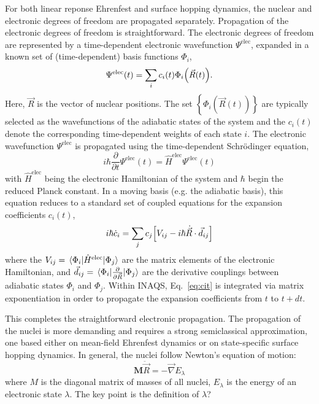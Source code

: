 \documentclass[journal=jctcce,manuscript=article,layout=traditional]{achemso}
\newcommand{\mat}[1]{\ensuremath{\mathbf{#1}}}
\newcommand{\refeq}[1]{Eq.~\ref{#1}}
\begin{document}
For both linear reponse Ehrenfest and surface hopping dynamics, 
the nuclear and electronic degrees of freedom are propagated separately.
Propagation of the electronic degrees of freedom is straightforward.
The electronic degrees of freedom are represented by a time-dependent electronic wavefunction $\Psi^{\textrm{elec}}$, expanded in a known set of (time-dependent) basis functions $\Phi_i$,
\begin{equation}
    \Psi^{\textrm{elec}}(t) = \sum_i c_i(t) \Phi_i \qty(\vec{R}(t)).
\end{equation}
Here, $\vec{R}$ is the vector of nuclear positions.
%
The set $\left\{\Phi_i(\vec{R}(t))\right\}$ are typically selected as the wavefunctions of the adiabatic states of the system and the $c_i(t)$ denote the corresponding time-dependent weights of each state $i$.
The electronic wavefunction $\Psi^{\textrm{elec}}$ is propagated using the time-dependent Schr\"{o}dinger equation,
\begin{equation}
    i\hbar \dfrac{\partial}{\partial t} \Psi^{\textrm{elec}}(t) = \hat{H}^{\textrm{elec}} \Psi^{\textrm{elec}}(t)
\end{equation}
with $\hat{H}^{\textrm{elec}}$ being the electronic Hamiltonian of the system and $\hbar$ begin the reduced Planck constant.
In a moving basis (e.g. the adiabatic basis), this equation reduces to a standard set of coupled equations for the expansion coefficients $c_i(t)$,
\begin{equation}\label{eq:cit}
  i\hbar \dot{c}_i = \sum_j c_j \qty[V_{ij} - i\hbar\dot{\vec{R}}\cdot \vec{d}_{ij}]
\end{equation}
where the $V_{ij} = \mel{\Phi_i}{\hat{H}^{\textrm{elec}}}{\Phi_j}$ are the matrix elements of the electronic Hamiltonian, and $\vec{d}_{ij}=\mel{\Phi_i}{\frac{\partial}{\partial \vec{R}}}{\Phi_j}$ are the derivative couplings between adiabatic states ${\Phi_i}$ and ${\Phi_j}$.
%
Within INAQS, \refeq{eq:cit} is integrated via matrix exponentiation in order to propagate the expansion coefficients from $t$ to $t+dt$.

This completes the straightforward electronic propagation. The propagation of the nuclei is more demanding and requires a strong semiclassical approximation, one based either on mean-field Ehrenfest dynamics or on  state-specific surface hopping dynamics. In general, 
the nuclei follow Newton's equation of motion:
\begin{equation}\label{eq:newton}
    \mat{M} \ddot{\vec{R}} = - \vec{\nabla} E_{\lambda}
\end{equation}
where $M$ is the diagonal matrix of masses of all nuclei, $E_{\lambda}$ is the energy of an electronic state $\lambda$. The key point is the definition of $\lambda$?
\end{document}
